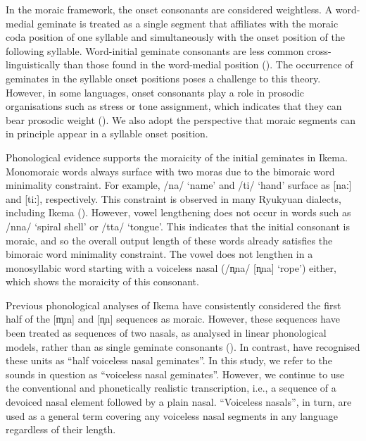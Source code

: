 \documentclass[output=paper]{langscibook}
\begin{document}
In the moraic framework, the onset consonants are considered weightless. A word-medial geminate is treated as a single segment that affiliates with the moraic coda position of one syllable and simultaneously with the onset position of the following syllable. Word-initial geminate consonants are less common cross-linguistically than those found in the word-medial position (\citealt{Dmitrieva2012,HamzahEtAl2020,Kraehenmann2001,Muller2003,Thurgood1993}). The occurrence of geminates in the syllable onset positions poses a challenge to this theory. However, in some languages, onset consonants play a role in prosodic organisations such as stress or tone assignment, which indicates that they can bear prosodic weight (\citealt{Davis1999,Gordon2004,Topintzi2008,ShinoharaFujimoto2011}). We also adopt the perspective that moraic segments can in principle appear in a syllable onset position.

Phonological evidence supports the moraicity of the initial geminates in Ikema. Monomoraic words always surface with two moras due to the bimoraic word minimality constraint. For example, /na/ ‘name’ and /ti/ ‘hand’ surface as [naː] and [tiː], respectively. This constraint is observed in many Ryukyuan dialects, including Ikema (\citealt{Shimoji2010,PellardHayashi2012}). However, vowel lengthening does not occur in words such as /nna/ ‘spiral shell’ or /tta/ ‘tongue’. This indicates that the initial consonant is moraic, and so the overall output length of these words already satisfies the bimoraic word minimality constraint. The vowel does not lengthen in a monosyllabic word starting with a voiceless nasal (/n̥na/ [n̥na] ‘rope’) either, which shows the moraicity of this consonant.

\largerpage
Previous phonological analyses of Ikema have consistently considered the first half of the [m̥m] and [n̥n] sequences as moraic. However, these sequences have been treated as sequences of two nasals, as analysed in linear phonological models, rather than as single geminate consonants (\citealt{Hirayama1983,Uchima1984,Hayashi2007,Hayashi2010,IgarashiEtAl2011,Takubo2021,NakamaEtAl2022}). In contrast, \citet{ShinoharaFujimoto2018} have recognised these units as “half voiceless nasal geminates”. In this study, we refer to the sounds in question as “voiceless nasal geminates”. However, we continue to use the conventional and phonetically realistic transcription, i.e., a sequence of a devoiced nasal element followed by a plain nasal. “Voiceless nasals”, in turn, are used as a general term covering any voiceless nasal segments in any language regardless of their length.
\end{document}

